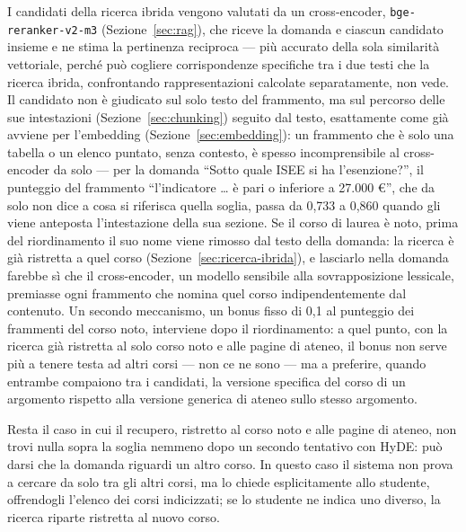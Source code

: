 I candidati della ricerca ibrida vengono valutati da un cross-encoder, \texttt{bge-reranker-v2-m3}
(Sezione~\ref{sec:rag}), che riceve la domanda e ciascun candidato insieme e ne stima la pertinenza reciproca --- più
accurato della sola similarità vettoriale, perché può cogliere corrispondenze specifiche tra i due testi che la
ricerca ibrida, confrontando rappresentazioni calcolate separatamente, non vede. Il candidato non è giudicato sul
solo testo del frammento, ma sul percorso delle sue intestazioni (Sezione~\ref{sec:chunking}) seguito dal testo,
esattamente come già avviene per l'embedding (Sezione~\ref{sec:embedding}): un frammento che è solo una tabella o un
elenco puntato, senza contesto, è spesso incomprensibile al cross-encoder da solo --- per la domanda ``Sotto quale
ISEE si ha l'esenzione?'', il punteggio del frammento ``l'indicatore \dots{} è pari o inferiore a 27.000 €'', che da
solo non dice a cosa si riferisca quella soglia, passa da 0,733 a 0,860 quando gli viene anteposta l'intestazione
della sua sezione. Se il corso di laurea è noto, prima
del riordinamento il suo nome viene rimosso dal testo della domanda: la ricerca è già ristretta a quel corso
(Sezione~\ref{sec:ricerca-ibrida}), e lasciarlo nella domanda farebbe sì che il cross-encoder, un modello sensibile
alla sovrapposizione lessicale, premiasse ogni frammento che nomina quel corso indipendentemente dal contenuto. Un
secondo meccanismo, un bonus fisso di 0,1 al punteggio dei frammenti del corso noto, interviene dopo il riordinamento: a
quel punto, con la ricerca già ristretta al solo corso noto e alle pagine di ateneo, il bonus non serve più a
tenere testa ad altri corsi --- non ce ne sono --- ma a preferire, quando entrambe compaiono tra i candidati, la
versione specifica del corso di un argomento rispetto alla versione generica di ateneo sullo stesso argomento.

Resta il caso in cui il recupero, ristretto al corso noto e alle pagine di ateneo, non trovi nulla sopra la soglia
nemmeno dopo un secondo tentativo con HyDE: può darsi che la domanda riguardi un altro
corso. In questo caso il sistema non prova a cercare da solo tra gli altri
corsi, ma lo chiede esplicitamente allo studente, offrendogli l'elenco dei corsi indicizzati; se lo studente ne
indica uno diverso, la ricerca riparte ristretta al nuovo corso.

